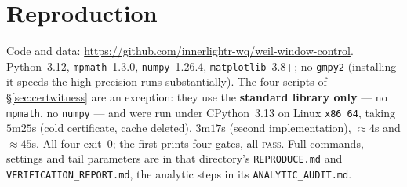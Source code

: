 \documentclass[11pt,a4paper]{article}
\theoremstyle{definition}
\theoremstyle{remark}
\begin{document}
\section{Reproduction}\label{app:repro}

Code and data: \url{https://github.com/innerlightr-wq/weil-window-control}.
Python~3.12, \texttt{mpmath}~1.3.0, \texttt{numpy}~1.26.4, \texttt{matplotlib}~3.8+;
no \texttt{gmpy2} (installing it speeds the high-precision runs substantially). The four
scripts of \S\ref{sec:certwitness} are an exception: they use the \textbf{standard library
only} --- no \texttt{mpmath}, no \texttt{numpy} --- and were run under CPython~3.13 on Linux
\texttt{x86\_64}, taking $5$m$25$s (cold certificate, cache deleted), $3$m$17$s (second
implementation), ${\approx}4$s and ${\approx}45$s. All four exit~$0$; the first prints four
gates, all \textsc{pass}. Full commands, settings and tail parameters are in that directory's
\texttt{REPRODUCE.md} and \texttt{VERIFICATION\_REPORT.md}, the analytic steps in its
\texttt{ANALYTIC\_AUDIT.md}.
\end{document}
